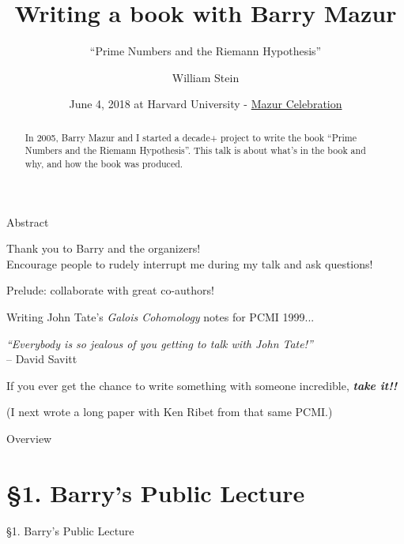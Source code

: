 \documentclass{beamer}
\title{Writing a book with Barry Mazur}
\subtitle{``Prime Numbers and the Riemann Hypothesis''}
\author[W.\thinspace{}Stein]{William Stein}
\date[Mazur 80]{June 4, 2018 at Harvard University - \href{http://www.math.harvard.edu/conferences/mazur18/}{Mazur Celebration}}
\institute[SageMath, Inc. \& UW]{SageMath, Inc. and University of Washington}
\newcommand{\mysection}[2]{\section{\S#1. #2}%
\begin{frame}{}
\vfill
\begin{center}
\hrulefill
\vfill
\Huge\sc \S#1. #2
\vfill
\hrulefill
\end{center}
\vfill
\end{frame}}
\begin{document}
\begin{frame}
  \titlepage
\end{frame}

\begin{frame}{Abstract}
  \begin{abstract}
    In 2005, Barry Mazur and I started a decade+ project to write the
    book ``Prime Numbers and the Riemann Hypothesis''.
    This talk is about
    what's in the book and why, and how the book was produced.
  \end{abstract}
  
  \vfill
  \hrulefill
  
  {\tiny Thank you to Barry and the organizers!}\\
    {\tiny Encourage people to rudely interrupt me during my talk and ask questions!}

\end{frame}

\begin{frame}{Prelude: collaborate with great co-authors!}

  Writing John Tate's {\em Galois Cohomology} notes for PCMI 1999...

  \vfill

  \begin{block}{}
    {\em
      ``Everybody is so jealous of you getting
      to talk with John Tate!''}\\
    -- David Savitt
  \end{block}

  \vfill

  If you ever get the chance
  to write something with someone incredible,
  {\bf\em take it!!}

  \vfill

  (I next wrote a long paper with Ken Ribet from that same PCMI.)

\end{frame}


\begin{frame}{Overview}
  \tableofcontents
\end{frame}

\mysection{1}{Barry's Public Lecture}
\end{document}
